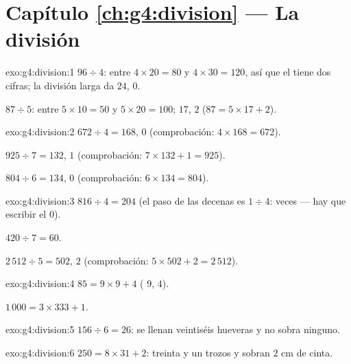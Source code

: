 \section*{Capítulo \ref{ch:g4:division} --- La división}

\begin{solution}{exo:g4:division:1}
$96 \div 4$: entre $4 \times 20 = 80$ y $4 \times 30 = 120$, así que
el  tiene dos cifras; la división larga da $24$, 
$0$.

$87 \div 5$: entre $5 \times 10 = 50$ y $5 \times 20 = 100$;
 $17$,  $2$ ($87 = 5 \times 17 + 2$).
\end{solution}

\begin{solution}{exo:g4:division:2}
$672 \div 4 = 168$,  $0$ (comprobación: $4 \times 168 = 672$).

$925 \div 7 = 132$,  $1$ (comprobación:
$7 \times 132 + 1 = 925$).

$804 \div 6 = 134$,  $0$ (comprobación: $6 \times 134 = 804$).
\end{solution}

\begin{solution}{exo:g4:division:3}
$816 \div 4 = 204$ (el paso de las decenas es $1 \div 4$:  veces ---
hay que escribir el $0$).

$420 \div 7 = 60$.

$2\,512 \div 5 = 502$,  $2$ (comprobación:
$5 \times 502 + 2 = 2\,512$).
\end{solution}

\begin{solution}{exo:g4:division:4}
$85 = 9 \times 9 + 4$ ( $9$,  $4$).

$1\,000 = 3 \times 333 + 1$.
\end{solution}

\begin{solution}{exo:g4:division:5}
$156 \div 6 = 26$: se llenan veintiséis hueveras y no sobra ninguno.
\end{solution}

\begin{solution}{exo:g4:division:6}
$250 = 8 \times 31 + 2$: treinta y un trozos y sobran $2$ cm de
cinta.
\end{solution}

